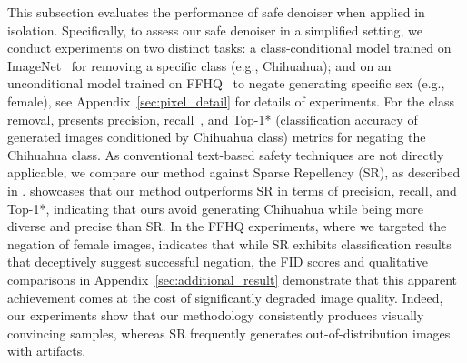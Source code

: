 \begin{table}
  \vskip -0.2in
\caption{Performance in FFHQ. We use ResNet18~\citep{he2016deep} to classify the sex of generated samples. We compute FID by comparing male data and generated images.}
    \label{tab:ffhq}
    \centering
    \vskip -0.1in
\end{table}
This subsection evaluates the performance of safe denoiser when applied in isolation. Specifically, to assess our safe denoiser in a simplified setting, we conduct experiments on two distinct tasks: a class-conditional model trained on ImageNet~\citep{russakovsky2015imagenet} for removing a specific class (e.g., Chihuahua); and on an unconditional model trained on FFHQ~\citep{karras2019style} to negate generating specific sex (e.g., female), see Appendix~\ref{sec:pixel_detail} for details of experiments. For the class removal,  presents precision, recall~\citep{kynkaanniemi2019improved}, and Top-1* (classification accuracy of generated images conditioned by Chihuahua class) metrics for negating the Chihuahua class. As conventional text-based safety techniques are not directly applicable, we compare our method against Sparse Repellency (SR), as described in .  showcases that our method outperforms SR in terms of precision, recall, and Top-1*, indicating that ours avoid generating Chihuahua while being more diverse and precise than SR. 
In the FFHQ experiments, where we targeted the negation of female images,  indicates that while SR exhibits classification results that deceptively suggest successful negation, the FID scores and qualitative comparisons in Appendix~\ref{sec:additional_result} demonstrate that this apparent achievement comes at the cost of significantly degraded image quality. Indeed, our experiments show that our methodology consistently produces visually convincing samples, whereas SR frequently generates out-of-distribution images with artifacts.

